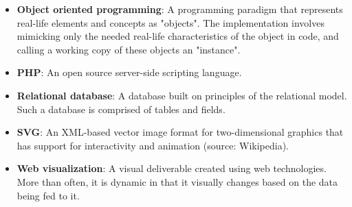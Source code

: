\documentclass[12pt]{article}
\begin{document}
\begin{itemize}
\item[] \textbf{Object oriented programming}: A programming paradigm that represents real-life elements and concepts as "objects". The implementation involves mimicking only the needed real-life characteristics of the object in code, and calling a working copy of these objects an "instance".
\item[] \textbf{PHP}: An open source server-side scripting language.
\item[] \textbf{Relational database}: A database built on principles of the relational model. Such a database is comprised of tables and fields.
\item[] \textbf{SVG}: An XML-based vector image format for two-dimensional graphics that has support for interactivity and animation (source: Wikipedia).
\item[] \textbf{Web visualization}: A visual deliverable created using web technologies. More than often, it is dynamic in that it visually changes based on the data being fed to it. 
\end{itemize}

\vfill
\end{document}

